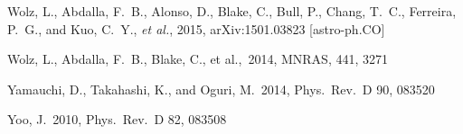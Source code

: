 \begin{thebibliography}{99}
\begin{multicols}{2}
{ 
  Wolz, L., Abdalla, F.~B., Alonso, D., Blake, C., Bull, P., Chang, T.~C., Ferreira, P.~G., and Kuo, C.~Y., {\it et al.}, 2015,
  arXiv:1501.03823 [astro-ph.CO]

 Wolz, L., Abdalla, F.~B., 
Blake, C., et al.,\ 2014, MNRAS, 441, 3271



  Yamauchi, D., Takahashi, K., and Oguri, M.\ 2014,
  Phys.\ Rev.\ D 90, 083520

  Yoo, J.\ 2010,
  Phys.\ Rev.\ D 82, 083508


}\end{multicols}
\end{thebibliography}



